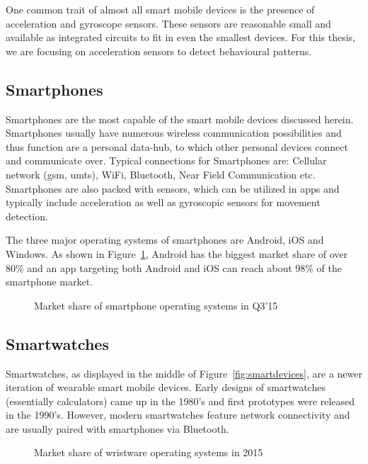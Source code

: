 One common trait of almost all smart mobile devices is the presence of acceleration and gyroscope sensors. These sensors are reasonable small and available as integrated circuits to fit in even the smallest devices. For this thesis, we are focusing on acceleration sensors to detect behavioural patterns.

\subsection{Smartphones}
Smartphones are the most capable of the smart mobile devices discussed herein. Smartphones usually have numerous wireless communication possibilities and thus function are a personal data-hub, to which other personal devices connect and communicate over. Typical connections for Smartphones are: Cellular network (\eg \acrshort{gsm}, \acrshort{umts}), WiFi, Bluetooth, Near Field Communication etc. Smartphones are also packed with sensors, which can be utilized in \glspl{app} and typically include acceleration as well as gyroscopic sensors for movement detection.

The three major operating systems of smartphones are Android, iOS and Windows. As shown in Figure~\ref{fig:smartphoneosmarketshare}, Android has the biggest market share of over 80\% and an \gls{app} targeting both Android and iOS can reach about 98\% of the smartphone market.

\begin{figure}
    \centering
    
    \caption{Market share of smartphone operating systems in Q3'15 \cite{gartner2015smartosmarketshare}}
    \label{fig:smartphoneosmarketshare}
\end{figure}

\subsection{Smartwatches}
Smartwatches, as displayed in the middle of Figure~\ref{fig:smartdevices}, are a newer iteration of wearable smart mobile devices. Early designs of smartwatches (essentially calculators) came up in the 1980's and first prototypes were released in the 1990's. However, modern smartwatches feature network connectivity and are usually paired with smartphones via Bluetooth.

\begin{figure}
    \centering
    
    \caption{Market share of wristware operating systems in 2015 \cite{idc2015wristmarketshare}}
    \label{fig:watchmarketshare}
\end{figure}

